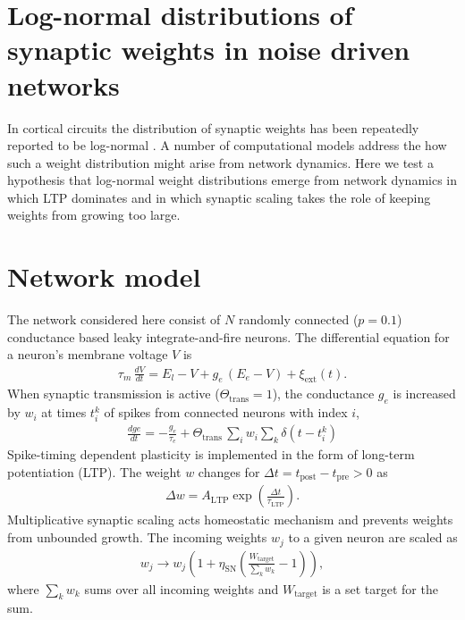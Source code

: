 \columnbreak
\section*{\LARGE Log-normal distributions of synaptic weights in noise driven networks}

In cortical circuits the distribution of synaptic weights has been repeatedly reported to be log-normal \cite{Song2005}. A number of computational models address the how such a weight distribution might arise from network dynamics. Here we test a hypothesis that log-normal weight distributions emerge from network dynamics in which LTP dominates and in which synaptic scaling takes the role of keeping weights from growing too large.

\vspace{-0.4cm}

\section*{Network model}

The network considered here consist of $N$ randomly connected ($p=0.1$) conductance based leaky integrate-and-fire neurons. The differential equation for a neuron's membrane voltage $V$ is
%
\begin{align}
 \tau_m\, \frac{dV}{dt}  = E_l - V + g_e \,(E_e - V) +  \xi_{\mathrm{ext}}(t). \label{eq:mem}
\end{align}
%
When synaptic transmission is active ($\Theta_{\text{trans}}=1$), the conductance $g_e$ is increased by $w_i$ at times $t_i^k$ of spikes from connected neurons with index $i$,
%
\begin{align}
 \frac{d ge}{dt} = - \frac{g_e}{\tau_e} +  \Theta_{\text{trans}}\, \sum_i w_i \sum_{k} \delta(t-t_i^k)
\end{align}
%
Spike-timing dependent plasticity is implemented in the form of long-term potentiation (LTP). The weight $w$ changes for $\Delta t = t_{\text{post}}-t_{\text{pre}} > 0$ as
\begin{align}
 \Delta w =  A_{\text{LTP}} \exp\left(\frac{\Delta t}{\tau_{\text{LTP}}}\right).
\end{align}
%
Multiplicative synaptic scaling acts homeostatic mechanism and prevents weights from unbounded growth. The incoming weights $w_j$ to a given neuron are scaled as
%
\begin{align}
 w_j \to w_j \left(1+ \eta_{\text{SN}} \left( \frac{W_{\text{target}}}{\sum_k w_k} -1\right) \right), \label{eq:sc}
\end{align}
%
where $\sum_k w_k$ sums over all incoming weights and $W_{\text{target}}$ is a set target for the sum.

